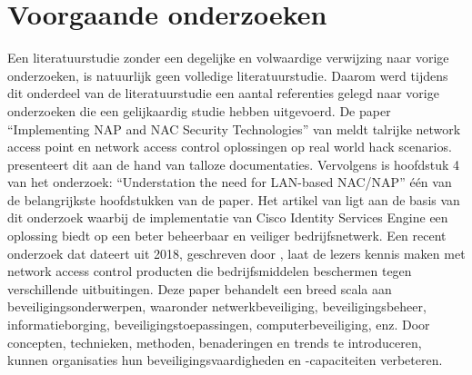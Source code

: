 \section{Voorgaande onderzoeken}
Een literatuurstudie zonder een degelijke en volwaardige verwijzing naar vorige onderzoeken, is natuurlijk geen volledige literatuurstudie. Daarom werd tijdens dit onderdeel van de literatuurstudie een aantal referenties gelegd naar vorige onderzoeken die een gelijkaardig studie hebben uitgevoerd.
\newline
\newline
De paper “Implementing NAP and NAC Security Technologies” van \cite{DanielV} meldt talrijke network access point en network access control oplossingen op real world hack scenarios. \cite{DanielV} presenteert dit aan de hand van talloze documentaties. Vervolgens is hoofdstuk 4 van het onderzoek: “Understation the need for LAN-based NAC/NAP” één van de belangrijkste hoofdstukken van de paper. Het artikel van \cite{DanielV} ligt aan de basis van dit onderzoek waarbij de implementatie van Cisco Identity Services Engine een oplossing biedt op een beter beheerbaar en veiliger bedrijfsnetwerk.
\newline
\newline 
Een recent onderzoek dat dateert uit 2018, geschreven door \cite{KevinDaimi}, laat de lezers kennis maken met network access control producten die bedrijfsmiddelen beschermen tegen verschillende uitbuitingen. Deze paper behandelt een breed scala aan beveiligingsonderwerpen, waaronder netwerkbeveiliging, beveiligingsbeheer, informatieborging, beveiligingstoepassingen, computerbeveiliging, enz. Door concepten, technieken, methoden, benaderingen en trends te introduceren, kunnen organisaties hun beveiligingsvaardigheden en -capaciteiten verbeteren. 

